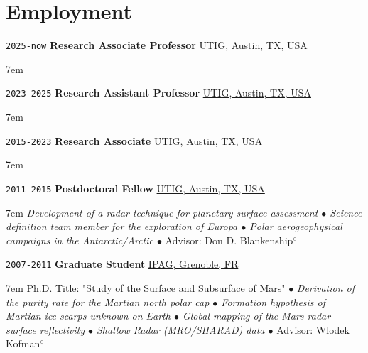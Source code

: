 
\section*{Employment}

\TabPositions{7em,28em}


\noindent \texttt{2025-now} \tab \textbf{Research Associate Professor} \tab
\href{https://www.ig.utexas.edu/}{UTIG, Austin, TX, USA}
\begin{adjustwidth}{7em}{}
\end{adjustwidth}
\vspace{-.5em}

\noindent \texttt{2023-2025} \tab \textbf{Research Assistant Professor} \tab
\href{https://www.ig.utexas.edu/}{UTIG, Austin, TX, USA}
\begin{adjustwidth}{7em}{}
\end{adjustwidth}
\vspace{-.5em}

\noindent \texttt{2015-2023} \tab \textbf{Research Associate} \tab
\href{https://www.ig.utexas.edu/}{UTIG, Austin, TX, USA}
\begin{adjustwidth}{7em}{}
\end{adjustwidth}
\vspace{-.5em}

\noindent \texttt{2011-2015} \tab \textbf{Postdoctoral Fellow} \tab
\href{https://www.ig.utexas.edu/}{UTIG, Austin, TX, USA}
\begin{adjustwidth}{7em}{}
\textit{Development of a radar technique for planetary surface assessment $\bullet$ Science definition team member for the exploration of Europa $\bullet$ Polar aerogeophysical campaigns in the Antarctic/Arctic $\bullet$} Advisor: Don D. Blankenship$^\lozenge$
\end{adjustwidth}
\vspace{.5em}

\noindent \texttt{2007-2011} \tab \textbf{Graduate Student} \tab
\href{http://ipag.osug.fr/}{IPAG, Grenoble, FR}
\vspace{.3em}
\begin{adjustwidth}{7em}{}
Ph.D. Title: "\ul{Study of the Surface and Subsurface of Mars}" 
$\bullet$
\textit{Derivation of the purity rate for the Martian north polar cap $\bullet$ Formation hypothesis of Martian ice scarps unknown on Earth $\bullet$ Global mapping of the Mars radar surface reflectivity $\bullet$ Shallow Radar (MRO/SHARAD) data $\bullet$} Advisor: Wlodek Kofman$^\lozenge$
\end{adjustwidth}
\vspace{.5em}

